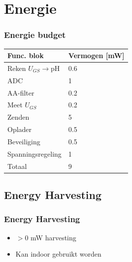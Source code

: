 \section{Energie}
\begin{frame}
    \frametitle{Energie budget}
    \begin{table}[ht]
        \centering
        \begin{tabular}{l|l}
            Func. blok          & Vermogen [mW] \\
            \hline                              
            Reken $U_{GS}\rightarrow$pH & 0.6   \\
            ADC                 & 1             \\
            AA-filter           & 0.2           \\
            Meet $U_{GS}$       & 0.2           \\
            Zenden              & 5             \\
            Oplader             & 0.5           \\
            Beveiliging         & 0.5           \\
            Spanningsregeling   & 1             \\ 
            \hline
            \hline
            Totaal              & 9
            
        \end{tabular}
        \label{tab:energieBudgetEstimatie}
    \end{table}
    
\end{frame}


    \subsection{Energy Harvesting}
    \begin{frame}
        \frametitle{Energy Harvesting}
        \begin{itemize}
            \item $>$0 mW harvesting
            \item Kan indoor gebruikt worden
        \end{itemize}

    \end{frame}


